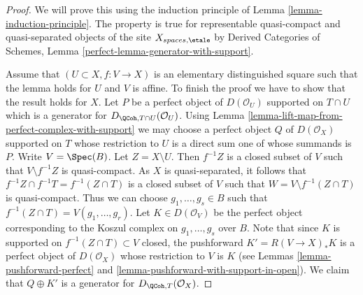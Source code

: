 \begin{proof}
We will prove this using the induction principle of
Lemma \ref{lemma-induction-principle}.
The property is true for representable quasi-compact
and quasi-separated objects of the site
$X_{spaces, \etale}$ by
Derived Categories of Schemes, Lemma
\ref{perfect-lemma-generator-with-support}.

\medskip\noindent
Assume that $(U \subset X, f : V \to X)$ is an elementary distinguished
square such that the lemma holds for $U$ and $V$ is affine. To finish
the proof we have to show that the result holds for $X$.
Let $P$ be a perfect object of $D(\mathcal{O}_U)$ supported on $T \cap U$
which is a generator for $D_{\QCoh, T \cap U}(\mathcal{O}_U)$. Using
Lemma \ref{lemma-lift-map-from-perfect-complex-with-support}
we may choose a perfect object $Q$ of $D(\mathcal{O}_X)$ supported on $T$
whose restriction to $U$ is a direct sum one of whose summands is $P$.
Write $V = \Spec(B)$. Let $Z = X \setminus U$. Then $f^{-1}Z$ is a closed
subset of $V$ such that $V \setminus f^{-1}Z$ is quasi-compact. As $X$
is quasi-separated, it follows that
$f^{-1}Z \cap f^{-1}T = f^{-1}(Z \cap T)$ is a closed
subset of $V$ such that $W = V \setminus f^{-1}(Z \cap T)$ is quasi-compact.
Thus we can choose $g_1, \ldots, g_s \in B$ such that
$f^{-1}(Z \cap T) = V(g_1, \ldots, g_r)$.
Let $K \in D(\mathcal{O}_V)$ be the perfect object corresponding to the
Koszul complex on $g_1, \ldots, g_s$ over $B$. Note that since $K$ is
supported on $f^{-1}(Z \cap T) \subset V$ closed, the pushforward
$K' = R(V \to X)_*K$ is a perfect object of $D(\mathcal{O}_X)$ whose
restriction to $V$ is $K$ (see Lemmas \ref{lemma-pushforward-perfect}
and \ref{lemma-pushforward-with-support-in-open}).
We claim that $Q \oplus K'$ is a generator for
$D_{\QCoh, T}(\mathcal{O}_X)$.


\end{proof}
